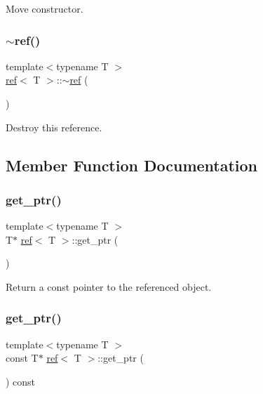 Move constructor. 

\mbox{\label{classref_a0f91cf031c803c7a34471dabce694454}} 
\subsubsection{\texorpdfstring{$\sim$ref()}{~ref()}}
{\footnotesize\ttfamily template$<$typename T $>$ \\
\mbox{\hyperlink{classref}{ref}}$<$ T $>$\+::$\sim$\mbox{\hyperlink{classref}{ref}} (\begin{DoxyParamCaption}{ }\end{DoxyParamCaption})\hspace{0.3cm}{\ttfamily [inline]}}



Destroy this reference. 



\subsection{Member Function Documentation}
\mbox{\label{classref_ad70261d8ee00b42350f69c96be30beaa}} 
\subsubsection{\texorpdfstring{get\_ptr()}{get\_ptr()}\hspace{0.1cm}{\footnotesize\ttfamily [1/2]}}
{\footnotesize\ttfamily template$<$typename T $>$ \\
T$\ast$ \mbox{\hyperlink{classref}{ref}}$<$ T $>$\+::get\+\_\+ptr (\begin{DoxyParamCaption}{ }\end{DoxyParamCaption})\hspace{0.3cm}{\ttfamily [inline]}}



Return a const pointer to the referenced object. 

\mbox{\label{classref_a76b8f2eec00eb3c3041cc9c7fb14ba0b}} 
\subsubsection{\texorpdfstring{get\_ptr()}{get\_ptr()}\hspace{0.1cm}{\footnotesize\ttfamily [2/2]}}
{\footnotesize\ttfamily template$<$typename T $>$ \\
const T$\ast$ \mbox{\hyperlink{classref}{ref}}$<$ T $>$\+::get\+\_\+ptr (\begin{DoxyParamCaption}{ }\end{DoxyParamCaption}) const\hspace{0.3cm}{\ttfamily [inline]}}



